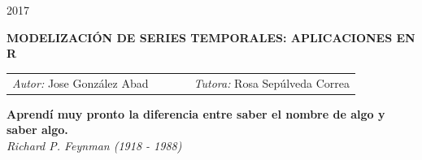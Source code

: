 \documentclass[12pt,a4paper,twoside]{article}
\begin{document}
\begin{titlepage}

\newcommand{\HRule}{\rule{\linewidth}{0.5mm}} 

\center 


\textsc{\huge 2017}\\[0.5cm] 



\vspace{5cm}
 \begin{spacing}{1}
 \huge \bfseries MODELIZACIÓN DE SERIES TEMPORALES: APLICACIONES EN R \\[0.4cm] 
\end{spacing}

\singlespacing

\vspace{6cm}
\begin{table}[H]
\centering
\begin{tabular}{lcccr}
\large \emph{Autor:} Jose González Abad & & & & \large \emph{Tutora:} Rosa Sepúlveda Correa
\end{tabular}
\end{table}


\vfill 

\end{titlepage}

\pagestyle{empty}
\vspace*{\fill}
\begin{footnotesize}
\begin{center}
\textbf{Aprendí muy pronto la diferencia entre saber el nombre de algo y saber algo.}\\
\emph{Richard P. Feynman (1918 - 1988)}
\end{center}
\end{footnotesize}
\vspace*{1cm}
\newpage
\end{document}
